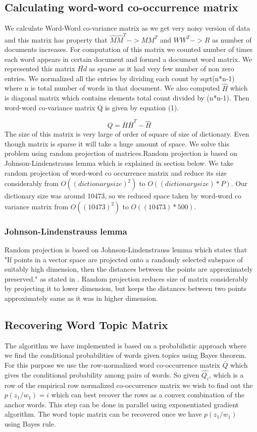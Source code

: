 \documentclass[a4paper,11pt]{article}
\begin{document}
\subsection{Calculating word-word co-occurrence matrix}
We calculate Word-Word co-variance matrix as we get very noisy version of data and this matrix has property that  $\hat{M} \hat{M}^T -> M M^T $ and $W W^T -> R$ as number of documents increases. For computation of this matrix we counted number of times each word appears in certain document and formed a document word matrix. We represented this matrix $\bar{Hd}$ as sparse as it had very few number of non zero entries. We normalized all the entries by dividing each count by sqrt(n*n-1) where n is total number of words in that document. We also computed $\hat{H}$ which is diagonal matrix which contains elements total count divided by (n*n-1). Then word-word co-variance matrix Q is given by equation (1).

\begin{equation}
Q = \bar{H} \bar{H}^T - \hat{H}
\end{equation}
The size of this matrix is very large of order of square of size of dictionary. Even though matrix is sparse it will take a huge amount of space. We solve this problem using random projection of matrices.Random projection is based on Johnson-Lindenstrauss lemma which is explained in section below. We take random projection of word-word co occurrence matrix and reduce its size considerably from $O((dictionary size)^2)$ to $O((dictionary size)*P)$. Our dictionary size was around 10473, so we reduced space taken by word-word co variance matrix from $O((10473)^2)$ to $O((10473)*500)$.

\subsubsection{Johnson-Lindenstrauss lemma}
Random projection is based on Johnson-Lindenstrauss lemma which states that "If points in a vector space are projected onto a randomly selected subspace of suitably high dimension, then the distances between the points are approximately preserved." as stated in \cite{randomProjection}. Random projection reduces size of matrix considerably by projecting it to lower dimension, but keeps the distances between two points approximately same as it was in higher dimension.


\subsection{Recovering Word Topic Matrix}
The algorithm we have implemented is based on a probabilistic approach where we find the conditional probabilities of words given topics using Bayes theorem. For this purpose we use the row-normalized word co-occurrence matrix $\bar{Q}$ which gives the conditional probability among pairs of words. So given $\hat{Q_{i}}$, which is a row of the empirical row normalized co-occurrence matrix we wish to find out the $p(z_{1}/w_{1})=i$ which can best recover the rows as a convex combination of the anchor words. This step can be done in parallel using exponentiated gradient algorithm. The word topic matrix can be recovered once we have $p(z_{1}/w_{1})$ using Bayes rule. 
\end{document}
